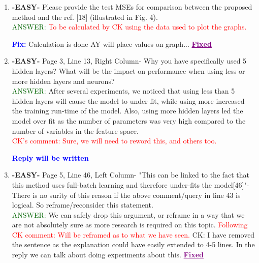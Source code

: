 \documentclass{article}
\newcommand{\fix}{\large \textcolor{blue}{ \textbf{Fix:} }}
\newcommand{\fixed}{\Large \textcolor{purple}{ \underline{\textbf{Fixed}} }}
\newcommand{\reply}{\large \textcolor{blue}{ \textbf{Reply will be written} }}
\begin{document}
\begin{enumerate}
\fix The names should be checked ... \fixed

\reply regarding the validation curves if we do not have space.


\item \textbf{-EASY-} Please provide the test MSEs for comparison between the proposed method and the ref. [18] (illustrated in Fig. 4).   \\
\textcolor{darkgreen}{ANSWER: }  \textcolor{red}{To be calculated by CK using the data used to plot the graphs.}

\fix Calculation is done AY will place values on graph... \fixed
    
    \item \textbf{-EASY-} Page 3, Line 13, Right Column- Why you have specifically used 5 hidden layers? What will be the impact on performance when using less or more hidden layers and neurons?\\
    \textcolor{darkgreen}{ANSWER: } After several experiments, we noticed that using less than 5 hidden layers will cause the model to under fit, while using more increased the training run-time of the model. Also, using more hidden layers led the model over fit as the number of parameters was very high compared to the number of variables in the feature space.  \\ \textcolor{red}{ CK's comment: Sure, we will need to reword this, and others too.}
    
    \reply

   
	\item \textbf{-EASY-} Page 5, Line 46, Left Column- "This can be linked to the fact that this method uses full-batch learning and therefore under-fits the model[46]"- There is no surity of this reason if the above comment/query in line 43 is logical. So reframe/reconsider this statement. \\
	
	\textcolor{darkgreen}{ANSWER: } We can safely drop this argument, or reframe in a way that we are not absolutely sure as more research is required on this topic. \textcolor{red}{Following CK comment: Will be reframed as to what we have seen.} CK: I have removed the sentence as the explanation could have easily extended to 4-5 lines. In the reply we can talk about doing experiments about this. \fixed


\end{enumerate}
\end{document}
